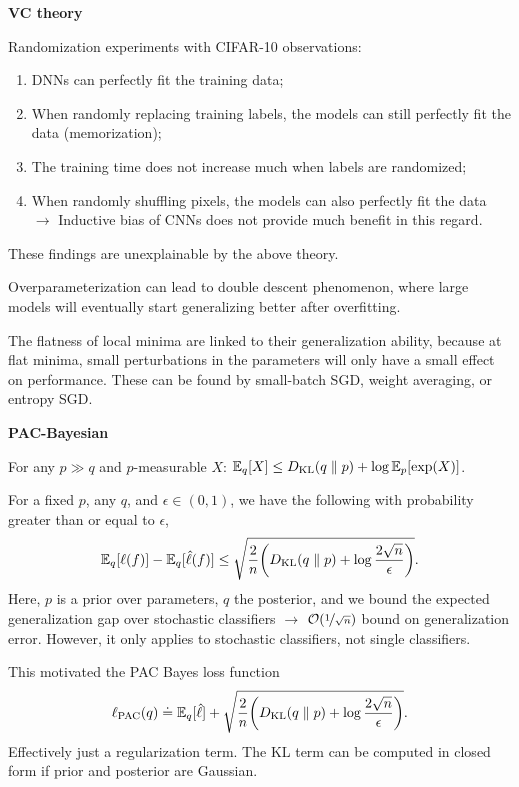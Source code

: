 \documentclass[10pt]{article}
\newenvironment{topic}[1]
{\textbf{\sffamily \footnotesize \colorbox{black}{\rlap{\textbf{\textcolor{white}{#1}}}\hspace{\linewidth}\hspace{-2\fboxsep}}}}
{}
\newenvironment{subtopic}[1]
{\begin{center}\textbf{\footnotesize \sffamily #1}\end{center}}
{}
\begin{document}
\begin{multicols*}{3}
\begin{topic}{Statistical learning theory}
\begin{subtopic}{VC theory}
            Randomization experiments with CIFAR-10 observations:
            \begin{enumerate}[left=0pt]
                \item DNNs can perfectly fit the training data;
                \item When randomly replacing training labels, the models can still perfectly fit the data
                      (memorization);
                \item The training time does not increase much when labels are randomized;
                \item When randomly shuffling pixels, the models can also perfectly fit the data $\to$ Inductive bias of
                      CNNs does not provide much benefit in this regard.
            \end{enumerate}
            These findings are unexplainable by the above theory.

            Overparameterization can lead to double descent phenomenon, where large models will eventually
            start generalizing better after overfitting.

            The flatness of local minima are linked to their generalization ability, because at flat minima,
            small perturbations in the parameters will only have a small effect on performance. These can be
            found by small-batch SGD, weight averaging, or entropy SGD.
        \end{subtopic}

        \begin{subtopic}{PAC-Bayesian}
            For any $p \gg q$ and $p$-measurable $X$: $\mathbb{E}_q[X] \leq D_{\mathrm{KL}}(q \;\|\; p) + \log \mathbb{E}_p[\exp(X)]$.

            For a fixed $p$, any $q$, and $\epsilon \in (0,1)$, we have the following with probability greater
            than or equal to $\epsilon$, \[
                \E_q[\ell(f)] - \E_q[\hat{\ell}(f)] \leq \sqrt{\frac{2}{n} \lft( D_{\mathrm{KL}}(q \;\|\; p) + \log \frac{2 \sqrt{n}}{\epsilon} \rgt)}.
            \]
            Here, $p$ is a prior over parameters, $q$ the posterior, and we bound the expected generalization
            gap over stochastic classifiers $\to$ $\bigo{\nicefrac{1}{\sqrt{n}}}$ bound on generalization
            error. However, it only applies to stochastic classifiers, not single classifiers.

            This motivated the PAC Bayes loss function \[
                \ell_{\mathrm{PAC}}(q) \doteq \E_q[\hat{\ell}] + \sqrt{\frac{2}{n} \lft( D_{\mathrm{KL}}(q \;\|\; p) + \log \frac{2\sqrt{n}}{\epsilon} \rgt)}.
            \]
            Effectively just a regularization term. The KL term can be computed in closed form if prior and
            posterior are Gaussian.
        \end{subtopic}


\end{topic}
\end{multicols*}
\end{document}
